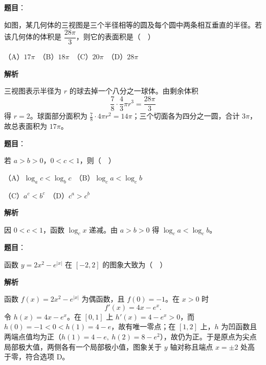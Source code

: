 \begin{answer}

\textbf{题目}：

如图，某几何体的三视图是三个半径相等的圆及每个圆中两条相互垂直的半径。若该几何体的体积是 \(\dfrac{28\pi}{3}\)，则它的表面积是（　）
\nopagebreak[4]
\begin{center}\end{center}
\nopagebreak[4]
   （A）\(17\pi\)　（B）\(18\pi\)　（C）\(20\pi\)　（D）\(28\pi\)

\textbf{解析}

三视图表示半径为 \(r\) 的球去掉一个八分之一球体。由剩余体积
\nopagebreak[4]
\[
\frac78\cdot\frac43\pi r^3=\frac{28\pi}{3}
\]
得 \(r=2\)。球面部分面积为 \(\frac78\cdot4\pi r^2=14\pi\)；三个切面各为四分之一圆，合计 \(3\pi\)，故总表面积为 \(17\pi\)。


\end{answer}
\begin{answer}

\textbf{题目}：

若 \(a>b>0\)，\(0<c<1\)，则（　）

   （A）\(\log_a c<\log_b c\)　（B）\(\log_c a<\log_c b\)

   （C）\(a^c<b^c\)　（D）\(c^a>c^b\)

\textbf{解析}

因 \(0<c<1\)，函数 \(\log_c x\) 递减。由 \(a>b>0\) 得 \(\log_c a<\log_c b\)。


\end{answer}
\begin{answer}

\textbf{题目}：

函数 \(y=2x^2-e^{|x|}\) 在 \([-2,2]\) 的图象大致为（　）
\nopagebreak[4]
\begin{center}\end{center}
\nopagebreak[4]
\textbf{解析}

函数 \(f(x)=2x^2-e^{|x|}\) 为偶函数，且 \(f(0)=-1\)。在 \(x>0\) 时
\nopagebreak[4]
\[
f'(x)=4x-e^x.
\]
令 \(h(x)=4x-e^x\)。在 \([0,1]\) 上 \(h'(x)=4-e^x>0\)，而 \(h(0)=-1<0<h(1)=4-e\)，故有唯一零点；在 \([1,2]\) 上，\(h\) 为凹函数且两端点值均为正（\(h(1)=4-e,\ h(2)=8-e^2\)），故仍为正。于是原点为尖点局部极大值，两侧各有一个局部极小值，图象关于 \(y\) 轴对称且端点 \(x=\pm2\) 处高于零，符合选项 D。


\end{answer}
